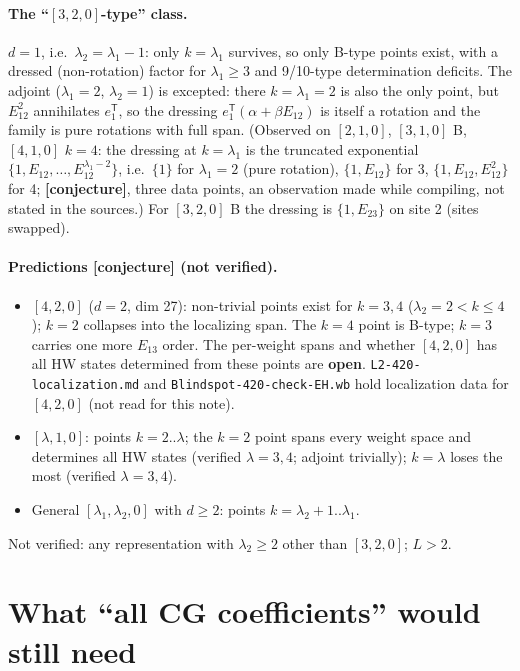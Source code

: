 \documentclass[11pt]{article}
\newcommand{\eT}{e_1^{\mathsf T}}
\newcommand{\cj}{\textbf{[conjecture]}}
\newcommand{\nb}[1]{\texttt{#1}}
\begin{document}
\paragraph{The ``$[3,2,0]$-type'' class.} $d=1$, i.e.\ $\lambda_2=\lambda_1-1$: only $k=\lambda_1$ survives, so only B-type points exist, with a dressed (non-rotation) factor for $\lambda_1\ge3$ and 9/10-type determination deficits. The adjoint ($\lambda_1=2$, $\lambda_2=1$) is excepted: there $k=\lambda_1=2$ is also the only point, but $E_{12}^2$ annihilates $\eT$, so the dressing $\eT(\alpha+\beta E_{12})$ is itself a rotation and the family is pure rotations with full span. (Observed on $[2,1,0]$, $[3,1,0]$ B, $[4,1,0]$ $k=4$: the dressing at $k=\lambda_1$ is the truncated exponential $\{1,E_{12},\ldots,E_{12}^{\lambda_1-2}\}$, i.e.\ $\{1\}$ for $\lambda_1=2$ (pure rotation), $\{1,E_{12}\}$ for 3, $\{1,E_{12},E_{12}^2\}$ for 4; \cj, three data points, an observation made while compiling, not stated in the sources.) For $[3,2,0]$ B the dressing is $\{1,E_{23}\}$ on site 2 (sites swapped).

\paragraph{Predictions \cj{} (not verified).}
\begin{itemize}
\item $[4,2,0]$ ($d=2$, dim 27): non-trivial points exist for $k=3,4$ ($\lambda_2=2<k\le4$); $k=2$ collapses into the localizing span. The $k=4$ point is B-type; $k=3$ carries one more $E_{13}$ order. The per-weight spans and whether $[4,2,0]$ has all HW states determined from these points are \textbf{open}. \nb{L2-420-localization.md} and \nb{Blindspot-420-check-EH.wb} hold localization data for $[4,2,0]$ (not read for this note).
\item $[\lambda,1,0]$: points $k=2..\lambda$; the $k=2$ point spans every weight space and determines all HW states (verified $\lambda=3,4$; adjoint trivially); $k=\lambda$ loses the most (verified $\lambda=3,4$).
\item General $[\lambda_1,\lambda_2,0]$ with $d\ge2$: points $k=\lambda_2+1..\lambda_1$.
\end{itemize}
Not verified: any representation with $\lambda_2\ge2$ other than $[3,2,0]$; $L>2$.

\section{What ``all CG coefficients'' would still need}\label{sec:layers}
\end{document}
